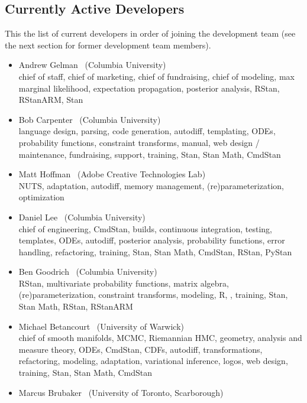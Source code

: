 \subsection*{Currently Active Developers}

This the list of current developers in order of joining the
development team (see the next section for former development team
members).

\begin{itemize}
\item Andrew Gelman \ (Columbia University)
\\ {\footnotesize chief of staff, chief of marketing, chief of
  fundraising, chief of modeling, max marginal likelihood,
  expectation propagation,  posterior analysis, RStan, RStanARM, Stan}
\item Bob Carpenter \ (Columbia University) \\ {\footnotesize language
    design, parsing, code generation, autodiff, templating, ODEs,
    probability functions, constraint transforms, manual, web design /
    maintenance, fundraising, support, training, Stan, Stan
    Math, CmdStan}
\item Matt Hoffman \ (Adobe Creative Technologies Lab)
\\ {\footnotesize NUTS, adaptation, autodiff, memory management,
  (re)parameterization, optimization \Cpp}
\item Daniel Lee \   (Columbia University)
\\ {\footnotesize chief of engineering, CmdStan, builds, continuous
  integration, testing, templates, ODEs, autodiff,
  posterior analysis, probability functions, error handling,
  refactoring, training, Stan, Stan Math, CmdStan, RStan, PyStan}
\item Ben Goodrich \   (Columbia University)
\\ {\footnotesize RStan, multivariate probability functions, matrix algebra,
  (re)parameterization, constraint transforms, modeling, R, \Cpp,
  training, Stan, Stan Math,  RStan, RStanARM}
\item Michael Betancourt \ (University of Warwick) \\
  {\footnotesize chief of smooth manifolds, MCMC, Riemannian HMC,
    geometry, analysis and measure theory, ODEs, CmdStan, CDFs,
    autodiff, transformations, refactoring, modeling, adaptation, variational
    inference, logos, web design, training, Stan, Stan Math, CmdStan}
\item Marcus Brubaker \   (University of Toronto, Scarborough)

\end{itemize}
